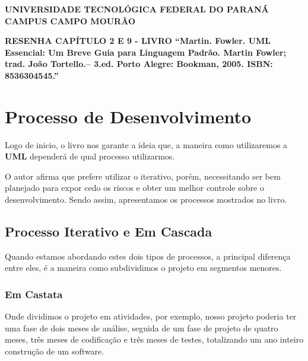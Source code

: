 \documentclass[a4paper, 12pt]{report}
\begin{document}
	\hspace{2cm}

	\begin{large}
		\begin{center}
			\textbf{UNIVERSIDADE TECNOLÓGICA FEDERAL DO PARANÁ}\newline
			\textbf{CAMPUS CAMPO MOURÃO}
		\end{center}
	\end{large}
	
	\vspace{0.5cm}
	
	\begin{center}
		\textbf{RESENHA CAPÍTULO 2 E 9 - LIVRO ``Martin. Fowler. UML Essencial: Um Breve Guia para Linguagem Padrão. Martin Fowler; trad. João Tortello.– 3.ed. Porto Alegre: Bookman, 2005. ISBN: 8536304545.''}
	\end{center}

	\vspace{-1cm}
	{\let\clearpage\relax \chapter{Processo de Desenvolvimento}}
	
	Logo de inicio, o livro nos garante a ideia que, a maneira como utilizaremos a \textbf{UML} dependerá de qual processo utilizarmos. 
	
	O autor afirma que prefere utilizar o iterativo, porém, necessitando ser bem planejado para expor cedo os riscos e obter um melhor controle sobre o desenvolvimento. Sendo assim, apresentamos os processos mostrados no livro.
	
	\section{Processo Iterativo e Em Cascada}
	
	Quando estamos abordando estes dois tipos de processos, a principal diferença entre eles, é a maneira como subdividimos o projeto em segmentos menores.
	
	\subsection{Em Castata}
	Onde dividimos o projeto em atividades, por exemplo, nosso projeto poderia ter uma fase de dois meses de análise, seguida de um fase de projeto de quatro meses, três meses de codificação e três meses de testes, totalizando um ano inteiro construção de um software.
	
\end{document}
